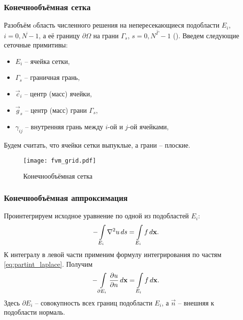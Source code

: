 \subsubsection{Конечнообъёмная сетка}
Разобъём oбласть численного решения на непересекающиеся подобласти $E_i$, $i = \overline{0, N-1}$,
а её границу $\partial \Omega$ на грани $\Gamma_s$, $s = \overline{0, N^\Gamma - 1}$ ().
Введем следующие сеточные примитивы:
\begin{itemize}
\item $E_i$ -- ячейка сетки,
\item $\Gamma_{s}$ -- граничная грань,
\item $\vec c_i$ -- центр (масс) ячейки,
\item $\vec g_s$ -- центр (масс) грани $\Gamma_{s}$,
\item $\gamma_{ij}$ -- внутренняя грань между $i$-ой и $j$-ой ячейками,
\end{itemize}
Будем считать, что ячейки сетки выпуклые, а грани -- плоские.

\begin{figure}[h!]
\centering
\texttt{[image: fvm\_grid.pdf]}
\caption{Конечнообъёмная сетка}
\label{fig:fvm_grid}
\end{figure}

\subsubsection{Конечнообъёмная аппроксимация}
\label{sec:fvm_appr}

Проинтегрируем исходное уравнение по одной из подобластей $E_i$:
\begin{equation*}
-\arint{\nabla^2 u}{E_i}{s} = \arint{f}{E_i}{\vec x}.
\end{equation*}
К интегралу в левой части применим формулу интегрирования по частям \cref{eq:partint_laplace}. Получим
\begin{equation}
\label{eq:fvm_pois_int}
-\arint{\dfr{u}{n}}{\partial E_i}{\vec x} = \arint{f}{E_i}{\vec x}.
\end{equation}
Здесь $\partial E_i$ -- совокупность всех границ подобласти $E_i$,
а $\vec n$ -- внешняя к подобласти нормаль.

